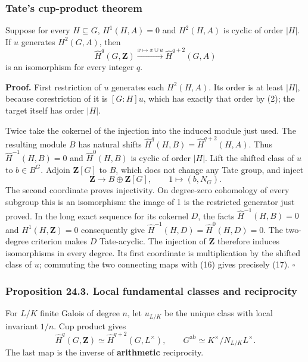 \documentclass[11pt,a4paper]{article}
\begin{document}
\subsubsection{Tate's cup-product
theorem}\label{tates-cup-product-theorem}

Suppose for every \(H\subseteq G\), \(H^1(H,A)=0\) and \(H^2(H,A)\) is
cyclic of order \(|H|\). If \(u\) generates \(H^2(G,A)\), then \[
\widehat H^q(G,\mathbf Z)\xrightarrow{x\mapsto x\cup u}
\widehat H^{q+2}(G,A)
\tag{17}
\] is an isomorphism for every integer \(q\).

\textbf{Proof.} First restriction of \(u\) generates each \(H^2(H,A)\).
Its order is at least \(|H|\), because corestriction of it is
\([G:H]u\), which has exactly that order by (2); the target itself has
order \(|H|\).

Twice take the cokernel of the injection into the induced module just
used. The resulting module \(B\) has natural shifts
\(\widehat H^q(H,B)=\widehat H^{q+2}(H,A)\). Thus
\(\widehat H^{-1}(H,B)=0\) and \(\widehat H^0(H,B)\) is cyclic of order
\(|H|\). Lift the shifted class of \(u\) to \(b\in B^G\). Adjoin
\(\mathbf Z[G]\) to \(B\), which does not change any Tate group, and
inject \[
\mathbf Z\longrightarrow B\oplus\mathbf Z[G],
\qquad 1\longmapsto(b,N_G).
\] The second coordinate proves injectivity. On degree-zero cohomology
of every subgroup this is an isomorphism: the image of 1 is the
restricted generator just proved. In the long exact sequence for its
cokernel \(D\), the facts \(\widehat H^{-1}(H,B)=0\) and
\(H^1(H,\mathbf Z)=0\) consequently give
\(\widehat H^{-1}(H,D)=\widehat H^0(H,D)=0\). The two-degree criterion
makes \(D\) Tate-acyclic. The injection of \(\mathbf Z\) therefore
induces isomorphisms in every degree. Its first coordinate is
multiplication by the shifted class of \(u\); commuting the two
connecting maps with (16) gives precisely (17). \(\square\)

\subsubsection{Proposition 24.3. Local fundamental classes and
reciprocity}\label{proposition-24.3.-local-fundamental-classes-and-reciprocity}

For \(L/K\) finite Galois of degree \(n\), let \(u_{L/K}\) be the unique
class with local invariant \(1/n\). Cup product gives \[
\widehat H^q(G,\mathbf Z)\simeq\widehat H^{q+2}(G,L^\times),
\qquad
G^{\mathrm{ab}}\simeq K^\times/N_{L/K}L^\times.
\tag{18}
\] The last map is the inverse of \textbf{arithmetic} reciprocity.
\end{document}
